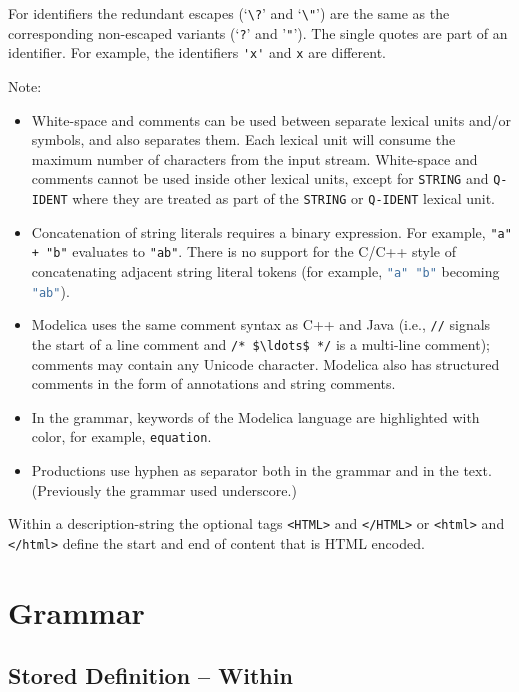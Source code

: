 For identifiers the redundant escapes (`\lstinline!\?!' and `\lstinline!\"!') are the same as the corresponding non-escaped variants (`\lstinline!?!' and '\lstinline!"!').
The single quotes are part of an identifier.
For example, the identifiers \lstinline!'x'! and \lstinline!x! are different.

Note:
\begin{itemize}
\item
  White-space and comments can be used between separate lexical units and/or symbols, and also separates them. Each lexical unit will consume the maximum number of characters from the input stream.
  White-space and comments cannot be used inside other lexical units, except for \lstinline[language=grammar]!STRING! and \lstinline[language=grammar]!Q-IDENT! where they are treated as part of the \lstinline[language=grammar]!STRING! or \lstinline[language=grammar]!Q-IDENT! lexical unit.
\item
  Concatenation of string literals requires a binary expression.
  For example, \lstinline!"a" + "b"! evaluates to \lstinline!"ab"!.
  There is no support for the C/C++ style of concatenating adjacent string literal tokens (for example, \lstinline[language=C]!"a" "b"! becoming \lstinline[language=C]!"ab"!).
\item
  Modelica uses the same comment syntax as C++ and Java (i.e., \lstinline!//! signals the start of a line comment and \lstinline!/* $\ldots$ */! is a multi-line comment); comments may contain any Unicode character.
  Modelica also has structured comments in the form of annotations and string comments.
\item
  In the grammar, keywords of the Modelica language are highlighted with color, for example, \lstinline[language=grammar]!equation!.
\item
  Productions use hyphen as separator both in the grammar and in the text.
  (Previously the grammar used underscore.)
\end{itemize}
\begin{nonnormative}
  Within a description-string the optional tags \lstinline!<HTML>! and \lstinline!</HTML>! or \lstinline!<html>! and \lstinline!</html>! define the start and end of content that is HTML encoded.
  \end{nonnormative}
\section{Grammar}\label{grammar}

\subsection{Stored Definition -- Within}\label{stored-definition-within}

